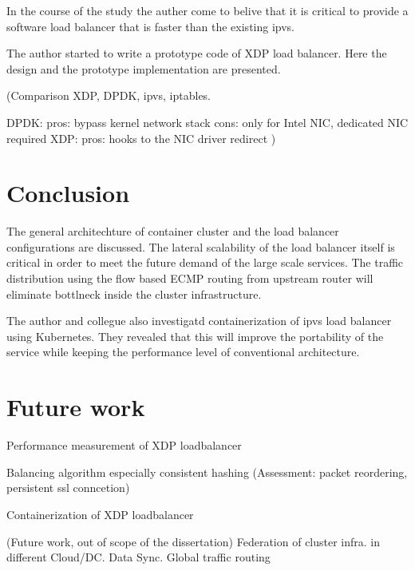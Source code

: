 In the course of the study the auther come to belive that it is critical to provide a software load balancer that is faster than the existing ipvs.

The author started to write a prototype code of XDP load balancer.
Here the design and the prototype implementation are presented.

(Comparison XDP, DPDK, ipvs, iptables.

DPDK: pros: bypass kernel network stack cons: only for Intel NIC, dedicated NIC required
XDP: pros: hooks to the NIC driver redirect
)

\section{Conclusion}\label{Conclusion}
The general architechture of container cluster and the load balancer configurations are discussed.
The lateral scalability of the load balancer itself is critical in order to meet the future demand of the large scale services. The traffic distribution using the flow based ECMP routing from upstream router will eliminate bottlneck inside the cluster infrastructure.

The author and collegue also investigatd containerization of ipvs load balancer using Kubernetes.
They revealed that this will improve the portability of the service while keeping the performance level of conventional architecture.



\section{Future work}\label{Future work}

Performance measurement of XDP loadbalancer

Balancing algorithm especially consistent hashing
(Assessment: packet reordering, persistent ssl conncetion)
 
Containerization of XDP loadbalancer


(Future work, out of scope of the dissertation)
Federation of cluster infra. in different Cloud/DC.
Data Sync.
Global traffic routing

